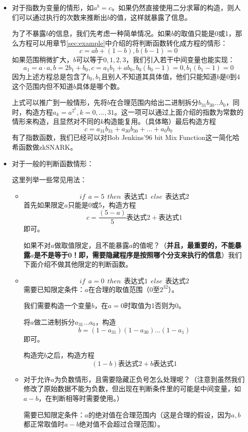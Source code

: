 \documentclass[12pt]{article}
\newcommand{\zk}{zkSNARK}
\begin{document}
\begin{itemize}
	\item 对于指数为变量的情形，如$a^b=c$。如果仍然直接使用二分求幂的构造，则人们可以通过执行的次数来推断出$b$的值，这样就暴露了信息。
	
	为了不暴露$b$的信息，我们先考虑一种简单情况。如果$b$的取值只能是0或1，那么方程可以用章节\ref{sec:example}中介绍的将判断函数转化成方程的情形：
	$$ c= ab+(1-b), b(b-1) = 0$$
	如果范围稍微扩大，$b$可以等于$0,1,2,3$，我们引入若干中间变量也能实现：
	$$a_1=a\cdot a, b=2b_1+b_0, c=a_1b_1+ab_0, b_0(b_0-1)=0, b_1(b_1-1)=0$$
	因为上述方程总是包含了$b_0,b_1$且别人不知道其具体值，他们只能知道$b$是0到4这个范围内但不知道$b$具体是哪个数。
	
	上式可以推广到一般情形，先将$b$在合理范围内给出二进制拆分$b_{31}b_{30}...b_0$，同时，构造方程$a_k=a^{2^k},k=0,...,31$。这一项可以通过上面介绍的指数为常数的情形来构造，且显然对不同的$k$构造能复用。（具体略）最后构造方程
	$$c= a_{31}b_{31}+a_{30}b_{30}+...+a_0b_0$$
	有了指数函数，我们已经可以对Bob Jenkins'96 bit Mix Function这一简化哈希函数做\zk。
	\item 对于一般的判断函数情形：
	
	这里列举一些常见用法：
	\begin{itemize} 
    \item	$$if~~a=5~~then~~\mbox{表达式1}~~else~~\mbox{表达式2}$$
     首先如果限定$a$只能是0或5，构造方程 $$c=\frac{(5-a)}{5}\mbox{表达式2}+\mbox{表达式1}$$即可。
     
     如果不对$a$做取值限定，且不能暴露$a$的值呢？（\textbf{并且，最重要的，不能暴露$a$是不是等于0！即，需要隐藏程序是按照哪个分支来执行的信息}）我们下面介绍不做其他限定的判断函数。
     \item $$if~~a=0~~then~~\mbox{表达式1}~~else~~\mbox{表达式2}$$
     需要已知限定条件：$a$在合理的取值范围（$0$至$2^{32}$）。
     
     我们需要构造一个变量$b$，在$a = 0$时取值为1否则为0。
     
     将$a$做二进制拆分$a_{31}...a_0$，构造
     $$b=(1-a_{31})(1-a_{30})...(1-a_1)$$即可。
     
     构造完$b$之后，构造方程$$(1-b)\mbox{表达式2}+b\mbox{表达式1}$$
     
     \item 对于允许$a$为负数情形，且需要隐藏正负号怎么处理呢？（注意到虽然我们修改了原始数据不能为负数，但出现在判断条件里的可能是中间变量，如$a-b$，在判断相等时需要使用。）
     
     需要已知限定条件：$a$的绝对值在合理范围内（这是合理的假设，因为$a,b$都正常取值时$a-b$绝对值不会超过合理范围）。
          

\end{itemize}
\end{itemize}
\end{document}
